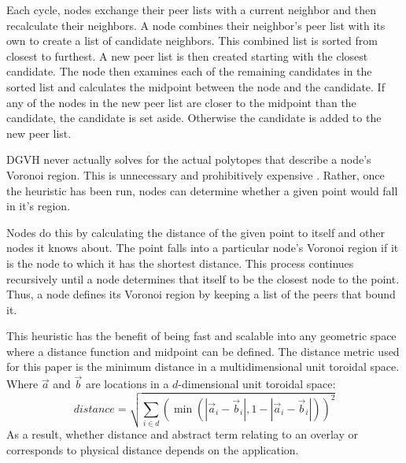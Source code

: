\documentclass[11pt, conference, letterpaper]{IEEEtran}
\begin{document}
Each cycle, nodes exchange their peer lists with a current neighbor and then recalculate their neighbors.  
A node combines their neighbor's peer list with its own to create a list of candidate neighbors.
This combined list is sorted from closest to furthest.
A new peer list is then created starting with the closest candidate.
The node then examines each of the remaining candidates in the sorted list and calculates the midpoint between the node and the candidate.
If any of the nodes in the new peer list are closer to the midpoint than the candidate, the candidate is set aside.  
Otherwise the candidate is added to the new peer list.









DGVH never actually solves for the actual polytopes that describe a node's Voronoi region.
This is unnecessary and prohibitively expensive \cite{raynet}.
Rather, once the heuristic has been run, nodes can determine whether a given point would fall in it's region.

Nodes do this by calculating the distance of the given point to itself and other nodes it knows about.
The point falls into a particular node's Voronoi region if it is the node to which it has the shortest distance.
This process continues recursively until a node determines that itself to be the closest node to the point.
Thus, a node defines its Voronoi region by keeping a list of the peers that bound it.



This heuristic has the benefit of being fast and scalable into any geometric space where a distance function and midpoint can be defined.
The distance metric used for this paper is the minimum distance in a multidimensional unit toroidal space.
Where $\vec{a}$ and $\vec{b}$ are locations in a $d$-dimensional unit toroidal space:
\[ distance = \sqrt{\sum\limits_{i\in d} (\min(|\vec{a}_i-\vec{b}_i|, 1-|\vec{a}_i-\vec{b}_i|))^2}\]
As a result, whether distance and abstract term relating to an overlay or corresponds to physical distance depends on the application.

\end{document}
